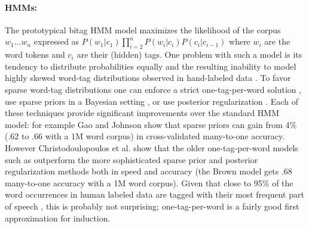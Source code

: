 \documentclass[11pt]{article}
\begin{document}
\paragraph{HMMs:}
The prototypical bitag HMM model maximizes the likelihood of the
corpus $w_1 \ldots w_n$ expressed as $P(w_1|c_1)\prod_{i=2}^n
P(w_i|c_i) P(c_i|c_{i-1})$ where $w_i$ are the word tokens and $c_i$
are their (hidden) tags.  One problem with such a model is its
tendency to distribute probabilities equally and the resulting
inability to model highly skewed word-tag distributions observed in
hand-labeled data \cite{johnson:2007:EMNLP-CoNLL2007}.  To favor
sparse word-tag distributions one can enforce a strict
one-tag-per-word solution
\cite{Brown:1992:CNG:176313.176316,Clark:2003:CDM:1067807.1067817},
use sparse priors in a Bayesian setting
\cite{goldwater-griffiths:2007:ACLMain,johnson:2007:EMNLP-CoNLL2007},
or use posterior regularization
\cite{Ganchev:2010:PRS:1859890.1859918}.  Each of these techniques
provide significant improvements over the standard HMM model: for
example Gao and Johnson  show
that sparse priors can gain from 4\% (.62 to .66 with a 1M word
corpus) in cross-validated many-to-one accuracy.  However
Christodoulopoulos et
al.  show that
the older one-tag-per-word models such as
\cite{Brown:1992:CNG:176313.176316} outperform the more sophisticated
sparse prior and posterior regularization methods both in speed and
accuracy (the Brown model gets .68 many-to-one accuracy with a 1M word
corpus).  Given that close to 95\% of the word occurrences in human
labeled data are tagged with their most frequent part of speech
\cite{Lee:2010:STU:1870658.1870741}, this is probably not surprising;
one-tag-per-word is a fairly good first approximation for induction.

\end{document}
